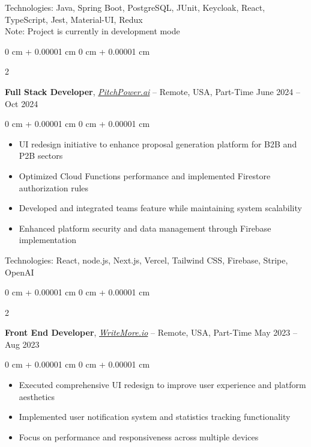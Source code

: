 \documentclass[10pt, letterpaper]{article}
\newenvironment{highlights}{
    \begin{itemize}[
        topsep=0.10 cm,
        parsep=0.10 cm,
        partopsep=0pt,
        itemsep=0pt,
        leftmargin=0 cm + 10pt
    ]
}{
    \end{itemize}
} %
\newenvironment{onecolentry}{
    \begin{adjustwidth}{
        0 cm + 0.00001 cm
    }{
        0 cm + 0.00001 cm
    }
}{
    \end{adjustwidth}
} %
\newenvironment{twocolentry}[2][]{
    \onecolentry
    \def\secondColumn{#2}
    \setcolumnwidth{\fill, 4.5 cm}
    \begin{paracol}{2}
}{
    \switchcolumn \raggedleft \secondColumn
    \end{paracol}
    \endonecolentry
} %
\let\hrefWithoutArrow\href
\begin{document}
    \vspace{0.2 cm}
    Technologies: Java, Spring Boot, PostgreSQL, JUnit, Keycloak, React, TypeScript, Jest, Material-UI, Redux \\
    \vspace{0.1 cm}
    Note: Project is currently in development mode

    \vspace{0.3 cm}
    
    \begin{twocolentry}{
        June 2024 – Oct 2024
    }
        \textbf{Full Stack Developer}, \hrefWithoutArrow{https://pitchpower.ai/}{\textit{PitchPower.ai}} -- Remote, USA, Part-Time\end{twocolentry}

    \vspace{0.20 cm}

    \begin{onecolentry}
        \begin{highlights}
            \item UI redesign initiative to enhance proposal generation platform for B2B and P2B sectors
            \item Optimized Cloud Functions performance and implemented Firestore authorization rules
            \item Developed and integrated teams feature while maintaining system scalability
            \item Enhanced platform security and data management through Firebase implementation
        \end{highlights}
    \end{onecolentry}

    \vspace{0.20 cm}
    Technologies: React, node.js, Next.js, Vercel, Tailwind CSS, Firebase, Stripe, OpenAI

    \vspace{0.3 cm}
    
    \begin{twocolentry}{
        May 2023 – Aug 2023
    }
        \textbf{Front End Developer}, \hrefWithoutArrow{https://writemore.io/}{\textit{WriteMore.io}} -- Remote, USA, Part-Time\end{twocolentry}

    \vspace{0.20 cm}

    \begin{onecolentry}
        \begin{highlights}
            \item Executed comprehensive UI redesign to improve user experience and platform aesthetics
            \item Implemented user notification system and statistics tracking functionality
            \item Focus on performance and responsiveness across multiple devices
        \end{highlights}
    \end{onecolentry}
\end{document}
